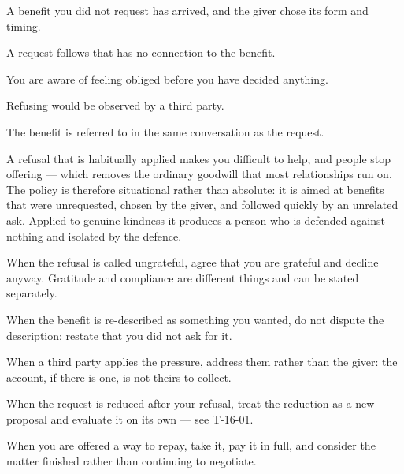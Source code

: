 \begin{feedback}
  \item A benefit you did not request has arrived, and the giver chose its form and timing.
  \item A request follows that has no connection to the benefit.
  \item You are aware of feeling obliged before you have decided anything.
  \item Refusing would be observed by a third party.
  \item The benefit is referred to in the same conversation as the request.
\end{feedback}

\begin{failure}
A refusal that is habitually applied makes you difficult to help, and people stop offering --- which removes the ordinary goodwill that most relationships run on. The policy is therefore situational rather than absolute: it is aimed at benefits that were unrequested, chosen by the giver, and followed quickly by an unrelated ask. Applied to genuine kindness it produces a person who is defended against nothing and isolated by the defence.
\end{failure}

\begin{countermeasures}
  \item When the refusal is called ungrateful, agree that you are grateful and decline anyway. Gratitude and compliance are different things and can be stated separately.
  \item When the benefit is re-described as something you wanted, do not dispute the description; restate that you did not ask for it.
  \item When a third party applies the pressure, address them rather than the giver: the account, if there is one, is not theirs to collect.
  \item When the request is reduced after your refusal, treat the reduction as a new proposal and evaluate it on its own --- see T-16-01.
  \item When you are offered a way to repay, take it, pay it in full, and consider the matter finished rather than continuing to negotiate.
\end{countermeasures}

\seesources
{}
